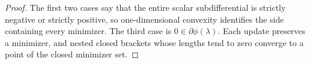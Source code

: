 \documentclass[10pt]{article}
\begin{document}
\begin{proof}
The first two cases say that the entire scalar subdifferential is strictly
negative or strictly positive, so one-dimensional convexity identifies the
side containing every minimizer.  The third case is
\(0\in\partial\phi(\lambda)\).  Each update preserves a minimizer, and nested
closed brackets whose lengths tend to zero converge to a point of the closed
minimizer set.
\end{proof}





{\footnotesize
\setlength{\bibsep}{0pt plus 0.2ex}


}
\end{document}

